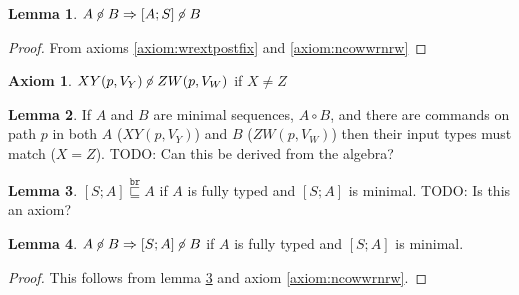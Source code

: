 \documentclass[12pt]{article}
\newcommand{\empt}{\bot}
\newcommand{\pp}{p^\uparrow} %
\newcommand{\fscommand}[2]{{#1#2}}
\newcommand{\fsregcommandchar}[1]{\mathtt{#1}}
\newcommand{\fsregcommand}[2]{\fscommand{\fsregcommandchar{#1}}{\fsregcommandchar{#2}}}
\newcommand{\cbf}{\fsregcommand{\empt}{F}}
\newcommand{\cbd}{\fsregcommand{\empt}{D}}
\newcommand{\cfb}{\fsregcommand{F}{\empt}}
\newcommand{\cfd}{\fsregcommand{F}{D}}
\newcommand{\cdb}{\fsregcommand{D}{\empt}}
\newcommand{\cdf}{\fsregcommand{D}{F}}
\newcommand{\cxy}{\fscommand{X}{Y}}
\newcommand{\czw}{\fscommand{Z}{W}}
\newcommand{\wrext}{\stackrel{\mathtt{br}}{\sqsubseteq}}
\newcommand{\coworks}{\circ}
\newcommand{\ncoworks}{\centernot\circ}
\theoremstyle{definition}
\newtheorem{myax}{Axiom}
\newtheorem{mylem}{Lemma}
\begin{document}
\begin{mylem}\label{lemma:ncowpostfix}$A\ncoworks B \Rightarrow [A;S]\ncoworks B$\end{mylem}
\begin{proof}From axioms \ref{axiom:wrextpostfix} and \ref{axiom:ncowwrnrw}\end{proof}

\begin{myax}$\cxy(p,V_Y)\ncoworks \czw(p,V_W)$ if $X\neq Z$\end{myax}

\begin{mylem}
If $A$ and $B$ are minimal sequences, $A\coworks B$,
and there are commands on path $p$ in both $A$ ($\cxy(p, V_Y)$) and $B$ ($\czw(p, V_W)$)
then their input types must match ($X=Z$).
TODO: Can this be derived from the algebra?
\end{mylem}

\begin{mylem}\label{lemma:wrextprefix}
$[S;A]\wrext A$
if $A$ is fully typed and $[S;A]$ is minimal.
TODO: Is this an axiom?
\end{mylem}

\begin{mylem}\label{lemma:ncowprefix}
$A\ncoworks B \Rightarrow [S;A]\ncoworks B$ 
if $A$ is fully typed and $[S;A]$ is minimal.
\end{mylem}
\begin{proof}
This follows from lemma \ref{lemma:wrextprefix} and axiom \ref{axiom:ncowwrnrw}.
\end{proof}
\end{document}
